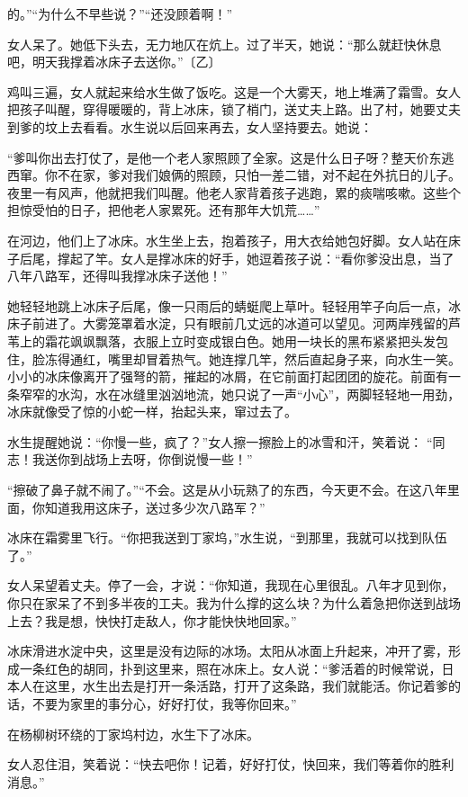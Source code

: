 \documentclass{ctexart}
\renewcommand{\\}{\par}
\begin{document}
的。”“为什么不早些说？”“还没顾着啊！”\\女人呆了。她低下头去，无力地仄在炕上。过了半天，她说：“那么就赶快休息吧，明天我撑着冰床子去送你。”〔乙〕\\鸡叫三遍，女人就起来给水生做了饭吃。这是一个大雾天，地上堆满了霜雪。女人把孩子叫醒，穿得暖暖的，背上冰床，锁了梢门，送丈夫上路。出了村，她要丈夫到爹的坟上去看看。水生说以后回来再去，女人坚持要去。她说：\\“爹叫你出去打仗了，是他一个老人家照顾了全家。这是什么日子呀？整天价东逃西窜。你不在家，爹对我们娘俩的照顾，只怕一差二错，对不起在外抗日的儿子。夜里一有风声，他就把我们叫醒。他老人家背着孩子逃跑，累的痰喘咳嗽。这些个担惊受怕的日子，把他老人家累死。还有那年大饥荒……”\\在河边，他们上了冰床。水生坐上去，抱着孩子，用大衣给她包好脚。女人站在床子后尾，撑起了竿。女人是撑冰床的好手，她逗着孩子说：“看你爹没出息，当了八年八路军，还得叫我撑冰床子送他！”\\她轻轻地跳上冰床子后尾，像一只雨后的蜻蜓爬上草叶。轻轻用竿子向后一点，冰床子前进了。大雾笼罩着水淀，只有眼前几丈远的冰道可以望见。河两岸残留的芦苇上的霜花飒飒飘落，衣服上立时变成银白色。她用一块长的黑布紧紧把头发包住，脸冻得通红，嘴里却冒着热气。她连撑几竿，然后直起身子来，向水生一笑。小小的冰床像离开了强弩的箭，摧起的冰屑，在它前面打起团团的旋花。前面有一条窄窄的水沟，水在冰缝里汹汹地流，她只说了一声“小心”，两脚轻轻地一用劲，冰床就像受了惊的小蛇一样，抬起头来，窜过去了。\\水生提醒她说：“你慢一些，疯了？”女人擦一擦脸上的冰雪和汗，笑着说： “同志！我送你到战场上去呀，你倒说慢一些！”\\“擦破了鼻子就不闹了。”“不会。这是从小玩熟了的东西，今天更不会。在这八年里面，你知道我用这床子，送过多少次八路军？”\\冰床在霜雾里飞行。“你把我送到丁家坞，”水生说，“到那里，我就可以找到队伍了。”\\女人呆望着丈夫。停了一会，才说：“你知道，我现在心里很乱。八年才见到你，你只在家呆了不到多半夜的工夫。我为什么撑的这么块？为什么着急把你送到战场上去？我是想，快快打走敌人，你才能快快地回家。”\\冰床滑进水淀中央，这里是没有边际的冰场。太阳从冰面上升起来，冲开了雾，形成一条红色的胡同，扑到这里来，照在冰床上。女人说：“爹活着的时候常说，日本人在这里，水生出去是打开一条活路，打开了这条路，我们就能活。你记着爹的话，不要为家里的事分心，好好打仗，我等你回来。”\\在杨柳树环绕的丁家坞村边，水生下了冰床。\\女人忍住泪，笑着说：“快去吧你！记着，好好打仗，快回来，我们等着你的胜利消息。”\\ 
\end{document}
